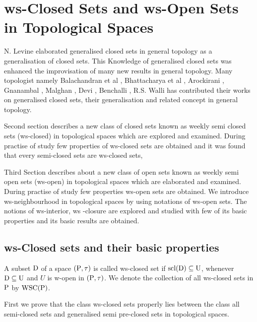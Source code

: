 \chapter{ws-Closed Sets and ws-Open Sets in Topological Spaces}
\graphicspath{{Chapter2/Chapter2Figs/EPS/}{Chapter2/Chapter2Figs/}}

N. Levine \cite{Levine} elaborated generalised closed sets in general topology as a generalisation of closed sets. This Knowledge of generalised closed sets was enhanced the improvisation of many new results in general topology. Many topologist namely Balachandran et al \cite{Balachandran}, Bhattacharya et al \cite{Bhattacharya}, Arockirani \cite{Arockiarani}, Gnanambal \cite{Gnanambal}, Malghan \cite{Malghan}, Devi \cite{Devi}, Benchalli \cite{Benchalli}, R.S. Walli \cite{Wali2} has contributed their works on generalised closed sets, their generalisation and related concept in general topology.

Second section describes a new class of closed sets known as weekly semi closed sets (ws-closed) in topological spaces which are explored and examined. During practise of study few properties of ws-closed sets are obtained and it was found that every semi-closed sets are ws-closed sets,

Third Section describes about a new class of open sets known as weekly semi open sets (ws-open) in topological spaces which are elaborated and examined. During practise of study few properties ws-open sets are obtained. We introduce ws-neighbourhood in topological spaces by using notations of ws-open sets. The notions of ws-interior, ws -closure are explored and studied with few of its basic properties and its basic results are obtained.

\section{ws-Closed sets and their basic properties}\label{sec2.1}

\begin{dfn}\label{defi2.1.1}
A subset $\mathrm{D}$ of a space $(\mathrm{P},\tau)$ is called ws-closed set if $\mathrm{scl}(\mathrm{D}) \subseteq \mathrm{U}$, whenever $\mathrm{D}\subseteq \mathrm{U}$ and $U$ is w-open in $(\mathrm{P},\tau)$. We denote the collection of all ws-closed sets in $\mathrm{P}$ by $\mbox{WSC}(\mathrm{P})$.
\end{dfn}

First we prove that the class ws-closed sets properly lies between the class all semi-closed sets and generalised semi pre-closed sets in topological spaces.

